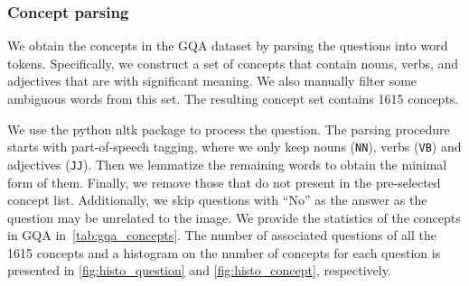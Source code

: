 \documentclass{article} \usepackage{iclr2022_conference,times}
\begin{document}
\subsubsection{Concept parsing}
We obtain the concepts in the GQA dataset by parsing the questions into word tokens. Specifically, we construct a set of concepts that contain nouns, verbs, and adjectives that are with significant meaning. We also manually filter some ambiguous words from this set. The resulting concept set contains 1615 concepts. 

We use the python nltk package to process the question. The parsing procedure starts with part-of-speech tagging, where we only keep nouns (\texttt{NN}), verbs (\texttt{VB}) and adjectives (\texttt{JJ}). Then we lemmatize the remaining words to obtain the minimal form of them. Finally, we remove those that do not present in the pre-selected concept list. Additionally, we skip questions with ``No'' as the answer as the question may be unrelated to the image. We provide the statistics of the concepts in GQA in~\autoref{tab:gqa_concepts}. The number of associated questions of all the 1615 concepts and a histogram on the number of concepts for each question is presented in \autoref{fig:histo_question} and \autoref{fig:histo_concept}, respectively.
\end{document}

